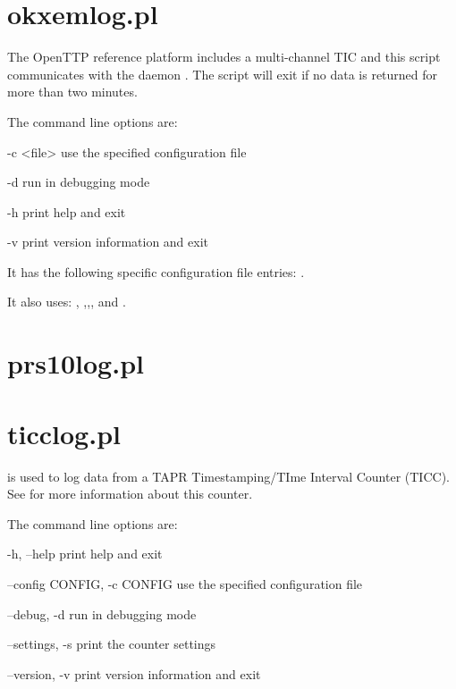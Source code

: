 \section{okxemlog.pl}
\hypertarget{h:okxemlog}{}
The OpenTTP reference platform includes a multi-channel TIC and this script communicates with the daemon
. The script will exit if no data is returned for more than two minutes.

The command line options are:
\begin{description*}
	\item[-c \textless file\textgreater] use the specified configuration file
	\item[-d]	run in debugging mode
	\item[-h]	print help and exit
	\item[-v]	print version information and exit
\end{description*}

It has the following specific configuration file entries:
.

It also uses: ,
,,, and 
.

\section{prs10log.pl}
\hypertarget{h:prs10log}{}

\section{ticclog.pl}
\hypertarget{h:ticclog}{}

 is used to log data from a TAPR Timestamping/TIme Interval Counter (TICC).
See  for more information about this counter.

The command line options are:
\begin{description*}
 \item[-h, --help] print help and exit
 \item[--config CONFIG, -c CONFIG] use the specified configuration file
 \item[ --debug, -d]           run in debugging mode
 \item[--settings, -s]        print the counter settings
  \item[--version, -v]        	print version information and exit
\end{description*}

